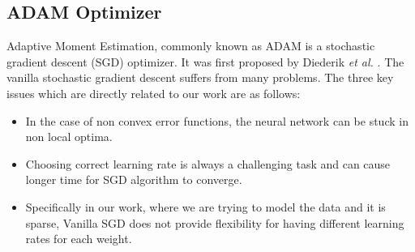 \subsection{ADAM Optimizer}

Adaptive Moment Estimation, commonly known as ADAM is a stochastic gradient descent (SGD) optimizer. It was first proposed by Diederik \textit{et al.} \cite{Adam}. The vanilla stochastic gradient descent suffers from many problems. The three key issues which are directly related to our work are as follows:
\begin{itemize}
    \item In the case of non convex error functions, the neural network can be stuck in non local optima.
    \item Choosing correct learning rate is always a challenging task and can cause longer time for SGD algorithm to converge.
    \item Specifically in our work, where we are trying to model the data and it is sparse, Vanilla SGD does not provide flexibility for having different learning rates for each weight.


\end{itemize}
